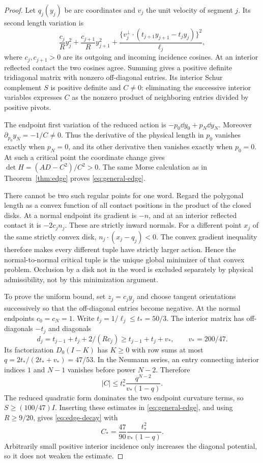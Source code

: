\begin{proof}
Let $q_j(y_j)$ be arc coordinates and $v_j$ the unit velocity of segment $j$. Its second length variation is
\[
 \frac{c_j}{R}y_j^2+\frac{c_{j+1}}{R}y_{j+1}^2+
 \frac{\{v_j^\perp\cdot(t_{j+1}y_{j+1}-t_jy_j)\}^2}{\ell_j},
\]
where $c_j,c_{j+1}>0$ are its outgoing and incoming incidence cosines. At an interior reflected contact the two cosines agree. Summing gives a positive definite tridiagonal matrix with nonzero off-diagonal entries. Its interior Schur complement $S$ is positive definite and $C\ne0$: eliminating the successive interior variables expresses $C$ as the nonzero product of neighboring entries divided by positive pivots.

The endpoint first variation of the reduced action is $-p_0\dd y_0+p_N\dd y_N$. Moreover $\partial_{p_0}y_N=-1/C\ne0$. Thus the derivative of the physical length in $p_0$ vanishes exactly when $p_N=0$, and its other derivative then vanishes exactly when $p_0=0$. At such a critical point the coordinate change gives $\det H=(AD-C^2)/C^2>0$. The same Morse calculation as in Theorem~\ref{thm:edge} proves \eqref{eq:general-edge}.

There cannot be two such regular points for one word. Regard the polygonal length as a convex function of all contact positions in the product of the closed disks. At a normal endpoint its gradient is $-n$, and at an interior reflected contact it is $-2c_j n_j$. These are strictly inward normals. For a different point $x_j$ of the same strictly convex disk, $n_j\cdot(x_j-q_j)<0$. The convex gradient inequality therefore makes every different tuple have strictly larger action. Hence the normal-to-normal critical tuple is the unique global minimizer of that convex problem. Occlusion by a disk not in the word is excluded separately by physical admissibility, not by this minimization argument.

To prove the uniform bound, set $z_j=c_jy_j$ and choose tangent orientations successively so that the off-diagonal entries become negative. At the normal endpoints $c_0=c_N=1$. Write $t_j=1/\ell_j\le t_*=50/3$. The interior matrix has off-diagonals $-t_j$ and diagonals
\[
         d_j=t_{j-1}+t_j+2/(Rc_j)\ge t_{j-1}+t_j+v_*,
             \qquad v_*=200/47.
\]
Its factorization $D_0(I-K)$ has $K\ge0$ with row sums at most
$q=2t_*/(2t_*+v_*)=47/53$. In the Neumann series, an entry connecting interior indices $1$ and $N-1$ vanishes before power $N-2$. Therefore
\[
 |C|\le t_*^2\frac{q^{N-2}}{v_*(1-q)}.
\]
The reduced quadratic form dominates the two endpoint curvature terms, so $S\ge (100/47)I$. Inserting these estimates in \eqref{eq:general-edge}, and using $R\ge9/20$, gives \eqref{eq:edge-decay} with
\[
 C_* = \frac{47}{90}\frac{t_*^2}{v_*(1-q)}.
\]
Arbitrarily small positive interior incidence only increases the diagonal potential, so it does not weaken the estimate.
\end{proof}

